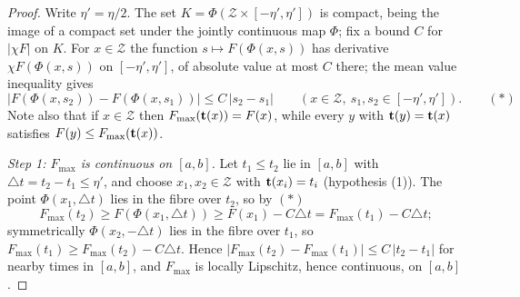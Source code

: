 \begin{proof}
\leanok
{}
Write $\eta'=\eta/2$. The set
$K=\Phi\left({\mathcal Z}\times[-\eta',\eta']\right)$ is compact, being
the image of a compact set under the jointly continuous map $\Phi$; fix
a bound $C$ for $|\chi F|$ on $K$. For $x\in{\mathcal Z}$ the function
$s\mapsto F(\Phi(x,s))$ has derivative $\chi F(\Phi(x,s))$ on
$[-\eta',\eta']$, of absolute value at most $C$ there; the mean value
inequality gives
$$\left|F(\Phi(x,s_2))-F(\Phi(x,s_1))\right|\le C\,|s_2-s_1|
\qquad\left(x\in{\mathcal Z},\ s_1,s_2\in[-\eta',\eta']\right).
\qquad(*)$$
Note also that if $x\in{\mathcal Z}$ then
$F_{\mathrm{max}}({\bf t}(x))=F(x)$, while every $y$ with
${\bf t}(y)={\bf t}(x)$ satisfies $F(y)\le F_{\mathrm{max}}({\bf t}(x))$.

{\em Step 1: $F_{\mathrm{max}}$ is continuous on $[a,b]$.} Let $t_1\le
t_2$ lie in $[a,b]$ with $\triangle t=t_2-t_1\le\eta'$, and choose
$x_1,x_2\in{\mathcal Z}$ with ${\bf t}(x_i)=t_i$ (hypothesis (1)). The
point $\Phi(x_1,\triangle t)$ lies in the fibre over $t_2$, so by $(*)$
$$F_{\mathrm{max}}(t_2)\ge F\left(\Phi(x_1,\triangle t)\right)\ge
F(x_1)-C\triangle t=F_{\mathrm{max}}(t_1)-C\triangle t;$$
symmetrically $\Phi(x_2,-\triangle t)$ lies in the fibre over $t_1$, so
$F_{\mathrm{max}}(t_1)\ge F_{\mathrm{max}}(t_2)-C\triangle t$. Hence
$|F_{\mathrm{max}}(t_2)-F_{\mathrm{max}}(t_1)|\le C\,|t_2-t_1|$ for
nearby times in $[a,b]$, and $F_{\mathrm{max}}$ is locally Lipschitz,
hence continuous, on $[a,b]$.


\end{proof}
